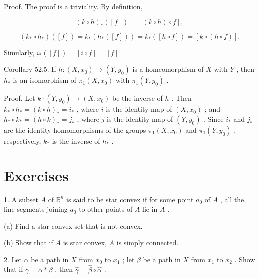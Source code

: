 Proof. The proof is a triviality. By definition,

\[
{\left( k \circ  h\right) }_{ * }\left( \left\lbrack  f\right\rbrack  \right)  = \left\lbrack  {\left( {k \circ  h}\right)  \circ  f}\right\rbrack  ,
\]

\[
\left( {{k}_{ * } \circ  {h}_{ * }}\right) \left( \left\lbrack  f\right\rbrack  \right)  = {k}_{ * }\left( {{h}_{ * }\left( \left\lbrack  f\right\rbrack  \right) }\right)  = {k}_{ * }\left( \left\lbrack  {h \circ  f}\right\rbrack  \right)  = \left\lbrack  {k \circ  \left( {h \circ  f}\right) }\right\rbrack  .
\]

Simularly, \({i}_{ * }\left( \left\lbrack  f\right\rbrack  \right)  = \left\lbrack  {i \circ  f}\right\rbrack   = \left\lbrack  f\right\rbrack\)

Corollary 52.5. If \(h : \left( {X,{x}_{0}}\right)  \rightarrow  \left( {Y,{y}_{0}}\right)\) is a homeomorphism of \(X\) with \(Y\) , then \({h}_{ * }\) is an isomorphism of \({\pi }_{1}\left( {X,{x}_{0}}\right)\) with \({\pi }_{1}\left( {Y,{y}_{0}}\right)\) .

Proof. Let \(k \cdot  \left( {Y,{y}_{0}}\right)  \rightarrow  \left( {X,{x}_{0}}\right)\) be the inverse of \(h\) . Then \({k}_{ * } \circ  {h}_{ * } = {\left( k \circ  h\right) }_{ * } = {i}_{ * }\) , where \(i\) is the identity map of \(\left( {X,{x}_{0}}\right)\) ; and \({h}_{ * } \circ  {k}_{ * } = {\left( h \circ  k\right) }_{ * } = {j}_{ * }\) , where \(j\) is the identity map of \(\left( {Y,{y}_{0}}\right)\) . Since \({i}_{ * }\) and \({j}_{ * }\) are the identity homomorphisms of the groups \({\pi }_{1}\left( {X,{x}_{0}}\right)\) and \({\pi }_{1}\left( {Y,{y}_{0}}\right)\) , respectively, \({k}_{ * }\) is the inverse of \({h}_{ * }\) .

\section*{Exercises}

1. A subset \(A\) of \({\mathbb{R}}^{n}\) is said to be star convex if for some point \({a}_{0}\) of \(A\) , all the line segments joining \({a}_{0}\) to other points of \(A\) lie in \(A\) .

(a) Find a star convex set that is not convex.

(b) Show that if \(A\) is star convex, \(A\) is simply connected.

2. Let \(\alpha\) be a path in \(X\) from \({x}_{0}\) to \({x}_{1}\) ; let \(\beta\) be a path in \(X\) from \({x}_{1}\) to \({x}_{2}\) . Show that if \(\gamma  = \alpha  * \beta\) , then \(\widehat{\gamma } = \widehat{\beta } \circ  \widehat{\alpha }\) .

